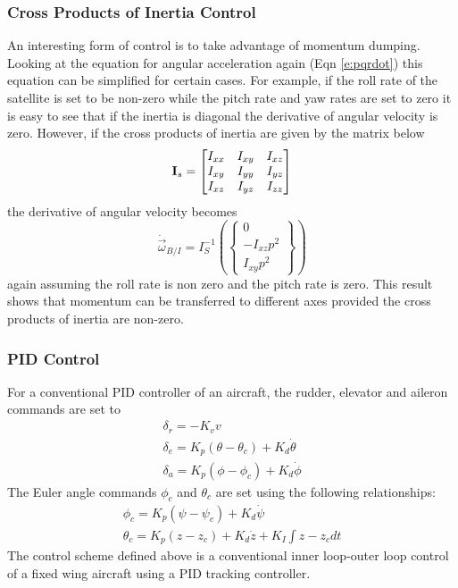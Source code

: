 \documentclass{article}
\begin{document}
\subsubsection{Cross Products of Inertia Control}

An interesting form of control is to take advantage of momentum
dumping. Looking at the equation for angular acceleration again (Eqn \ref{e:pqrdot}) this
equation can be simplified for certain cases. For example, if the roll
rate of the satellite is set to be non-zero while the pitch rate and
yaw rates are set to zero it is easy to see that if the inertia is
diagonal the derivative of angular velocity is zero. However, if the
cross products of inertia are given by the matrix below
\begin{equation}
  {\bf I}_s = \begin{bmatrix} I_{xx} & I_{xy} & I_{xz} \\ I_{xy} &
    I_{yy} & I_{yz} \\ I_{xz} & I_{yz} & I_{zz} \end{bmatrix}
\end{equation}
the derivative of angular velocity becomes
\begin{equation}
  \dot{\vec{\omega}}_{B/I} = I_S^{-1} \left (\begin{Bmatrix} 0
    \\ -I_{xz}p^2 \\ I_{xy}p^2 \end{Bmatrix} \right )
\end{equation}
again assuming the roll rate is non zero and the pitch rate is
zero. This result shows that momentum can be transferred to different
axes provided the cross products of inertia are non-zero.

\subsubsection{PID Control}

For a conventional PID controller of an aircraft, the rudder, elevator
and aileron commands are set to 
\begin{equation}
\begin{matrix}
\delta_{r} =-K_v v \\
\delta_{e} = K_p(\theta-\theta_{c})+K_d{\dot \theta} \\ 
\delta_a = K_p(\phi-\phi_{c})+K_d{\dot \phi}
\end{matrix}
\end{equation}
The Euler angle commands $\phi_{c}$ and $\theta_{c}$ are set using the
following relationships:
\begin{equation}
  \begin{matrix}
  \phi_{c} = K_p(\psi-\psi_c)+K_d\dot{\psi} \\
  \theta_{c} = K_p(z-z_c) + K_d\dot{z} + K_{I}\int{z-z_c}dt
  \end{matrix}
\end{equation}
The control scheme defined above is a conventional inner loop-outer
loop control of a fixed wing aircraft using a PID tracking
controller.
\end{document}
